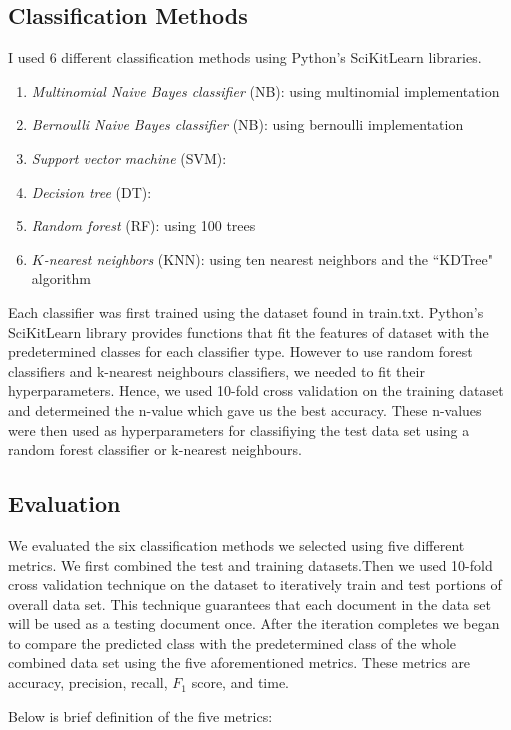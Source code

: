 \documentclass{article} %
\begin{document}
\subsection{Classification Methods}
I used 6 different classification methods using Python's SciKitLearn libraries.\cite{Pedregosa2011}
\begin{enumerate}
\item \emph{Multinomial Naive Bayes classifier} (NB): using multinomial implementation
\item \emph{Bernoulli Naive Bayes classifier} (NB): using bernoulli implementation
\item \emph{Support vector machine} (SVM): 
\item \emph{Decision tree} (DT): 
\item \emph{Random forest} (RF): using 100 trees
\item \emph{$K$-nearest neighbors} (KNN): using ten nearest neighbors and the ``KDTree" algorithm
\end{enumerate}

Each classifier was first trained using the dataset found in train.txt. Python's SciKitLearn library provides functions that fit the features of dataset with the predetermined classes for each classifier type. However to use random forest classifiers and k-nearest neighbours classifiers, we needed to fit their hyperparameters. Hence, we used 10-fold cross validation on the training dataset  and determeined the n-value which gave us the best accuracy. These n-values were then used as hyperparameters for classifiying the test data set using a random forest classifier or k-nearest neighbours. 

\subsection{Evaluation}
We evaluated the six classification methods we selected using five different metrics. We first combined the test and training datasets.Then we used 10-fold cross validation technique on the dataset to iteratively train and test portions of overall data set. This technique guarantees that each document in the data set will be used as a testing document once. After the iteration completes we began to compare the predicted class with the predetermined class of the whole combined data set using the five aforementioned metrics. These metrics are accuracy, precision, recall, $F_1$ score, and time. 

Below is brief definition of the five metrics: 
\end{document}
